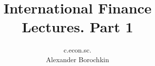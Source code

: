 \documentclass[xcolor=table, color=usenames, dvipsnames]{beamer}
\title[International Economics]{International Finance\\Lectures. Part 1}
\author{c.econ.sc.\\ Alexander Borochkin}
\institute{}
\date{\the\year}
\begin{document}
\begin{frame}
\titlepage
\end{frame}















\begin{comment}
\end{comment}
\end{document}

